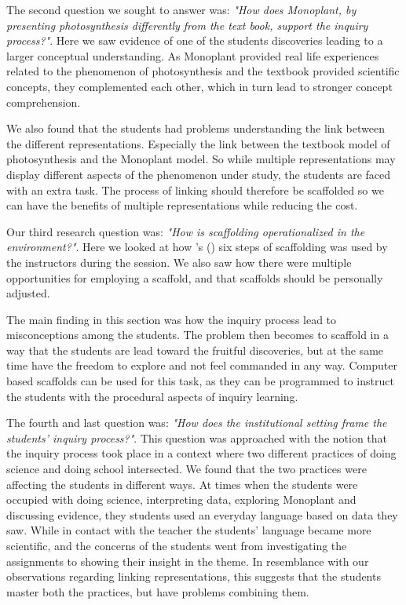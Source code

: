 The second question we sought to answer was: \emph{"How does Monoplant, by presenting photosynthesis differently from the text book, support the inquiry process?"}. Here we saw evidence of one of the students discoveries leading to a larger conceptual understanding. As Monoplant provided real life experiences related to the phenomenon of photosynthesis and the textbook provided scientific concepts, they complemented each other, which in turn lead to stronger concept comprehension. 

We also found that the students had problems understanding the link between the different representations. Especially the link between the textbook model of photosynthesis and the Monoplant model. So while multiple representations may display different aspects of the phenomenon under study, the students are faced with an extra task. The process of linking should therefore be scaffolded so we can have the benefits of multiple representations while reducing the cost. 


Our third research question was: \emph{"How is scaffolding operationalized in the environment?"}. Here we looked at how \citeauthor{wood1976role}'s (\citeyear{wood1976role}) six steps of scaffolding was used by the instructors during the session. We also saw how there were multiple opportunities for employing a scaffold, and that scaffolds should be personally adjusted. 

The main finding in this section was how the inquiry process lead to misconceptions among the students. The problem then becomes to scaffold in a way that the students are lead toward the fruitful discoveries, but at the same time have the freedom to explore and not feel commanded in any way. Computer based scaffolds can be used for this task, as they can be programmed to instruct the students with the procedural aspects of inquiry learning. 

The fourth and last question was: \emph{"How does the institutional setting frame the students' inquiry process?"}. This question was approached with the notion that the inquiry process took place in a context where two different practices of doing science and doing school intersected. We found that the two practices were affecting the students in different ways. At times when the students were occupied with doing science, interpreting data, exploring Monoplant and discussing evidence, they students used an everyday language based on data they saw. While in contact with the teacher the students' language became more scientific, and the concerns of the students went from investigating the assignments to showing their insight in the theme. In resemblance with our observations regarding linking representations, this suggests that the students master both the practices, but have problems combining them.

